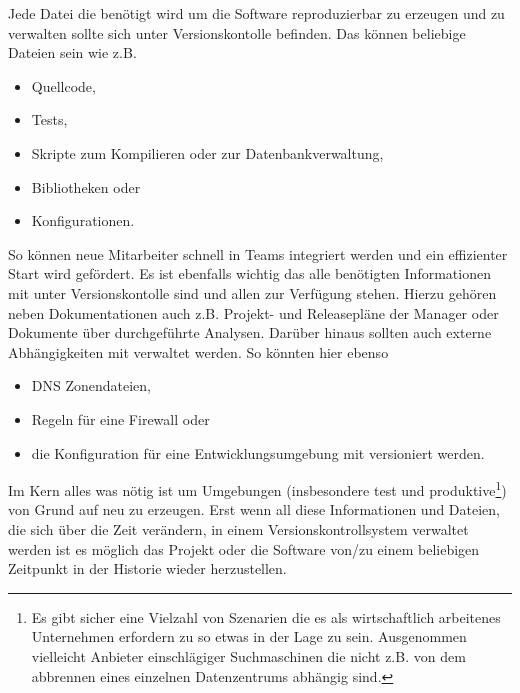 Jede Datei die benötigt wird um die Software reproduzierbar zu erzeugen und zu
verwalten sollte sich unter Versionskontolle befinden. Das können beliebige
Dateien sein wie z.B.

\begin{itemize}
\item Quellcode,
\item Tests,
\item Skripte zum Kompilieren oder zur Datenbankverwaltung,
\item Bibliotheken oder
\item Konfigurationen.
\end{itemize}

So können neue Mitarbeiter schnell in Teams integriert werden und ein
effizienter Start wird gefördert. Es ist ebenfalls wichtig das alle
benötigten Informationen mit unter Versionskontolle sind und allen zur
Verfügung stehen. Hierzu gehören neben Dokumentationen auch z.B. Projekt- und
Releasepläne der Manager oder Dokumente über durchgeführte Analysen. Darüber
hinaus sollten auch externe Abhängigkeiten mit verwaltet werden. So könnten
hier ebenso

\begin{itemize}
\item DNS Zonendateien,
\item Regeln für eine Firewall oder
\item die Konfiguration für eine Entwicklungsumgebung mit versioniert werden.
\end{itemize}

Im Kern alles was nötig ist um Umgebungen (insbesondere test und
produktive\footnote{Es gibt sicher eine Vielzahl von Szenarien die es als
wirtschaftlich arbeitenes Unternehmen erfordern zu so etwas in der Lage zu
sein. Ausgenommen vielleicht Anbieter einschlägiger Suchmaschinen die nicht
z.B. von dem abbrennen eines einzelnen Datenzentrums abhängig sind.}) von Grund
auf neu zu erzeugen. Erst wenn all diese Informationen und Dateien, die sich
über die Zeit verändern, in einem Versionskontrollsystem verwaltet werden ist
es möglich das Projekt oder die Software von/zu einem beliebigen Zeitpunkt in
der Historie wieder herzustellen. \cite[S.~33]{cd}

